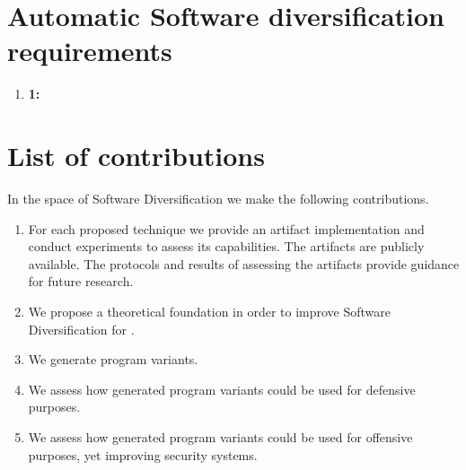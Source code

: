 
\section{Automatic Software diversification requirements}

\begin{enumerate}
	\item \textbf{1:} 
\end{enumerate}

\section{List of contributions}


In the space of Software Diversification we make the following contributions.

\begin{enumerate}[label=\textbf{C\arabic*}, ref=C\arabic*]
	\item \label{methodcontrib}  For each proposed technique we provide an artifact implementation and conduct experiments to assess its capabilities. The artifacts are publicly available. The protocols and results of assessing the artifacts provide guidance for future research.
	
	\item \label{therycontrib}  We propose a theoretical foundation in order to improve Software Diversification for \Wasm.
	
	\item \label{generationcontrib}  We generate \Wasm program variants.
	
	\item \label{defensivecontrib}  We assess how generated \Wasm program variants could be used for defensive purposes.
	
	\item \label{ofensivecontrib}  We assess how generated \Wasm program variants could be used for offensive purposes, yet improving security systems.
	
\end{enumerate}

